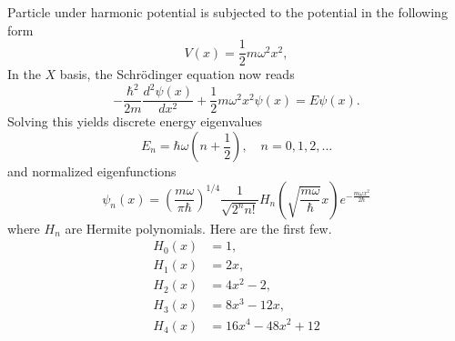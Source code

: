 \documentclass[../../../main.tex]{subfiles}
\begin{document}
Particle under harmonic potential is subjected to the potential in the following form
\begin{equation*}
    V(x) = \frac{1}{2} m \omega^{2} x^{2},
\end{equation*}
In the $X$ basis, the Schrödinger equation now reads
\begin{equation*}
    -\frac{\hbar^{2}}{2m} \frac{d^{2}\psi(x)}{dx^{2}} + \frac{1}{2}m\omega^{2}x^{2}\psi(x) = E\psi(x).
\end{equation*}
Solving this yields discrete energy eigenvalues
\[
    E_{n} = \hbar\omega \left(n + \frac{1}{2}\right), \quad n = 0, 1, 2, \ldots
\]
and normalized eigenfunctions
\[
    \psi_{n}(x) = \left(\frac{m\omega}{\pi\hbar}\right)^{1/4} \frac{1}{\sqrt{2^{n} n!}} H_{n}\left(\sqrt{\frac{m\omega}{\hbar}} x\right) e^{-\frac{m\omega x^{2}}{2\hbar}}
\]
where \(H_{n}\) are Hermite polynomials.
Here are the first few.
\begin{align*}
    H_{0}(x) & = 1,                     \\
    H_{1}(x) & = 2x,                    \\
    H_{2}(x) & = 4x^{2} - 2,            \\
    H_{3}(x) & = 8x^{3} - 12x,          \\
    H_{4}(x) & = 16x^{4} - 48x^{2} + 12
\end{align*}
\end{document}
